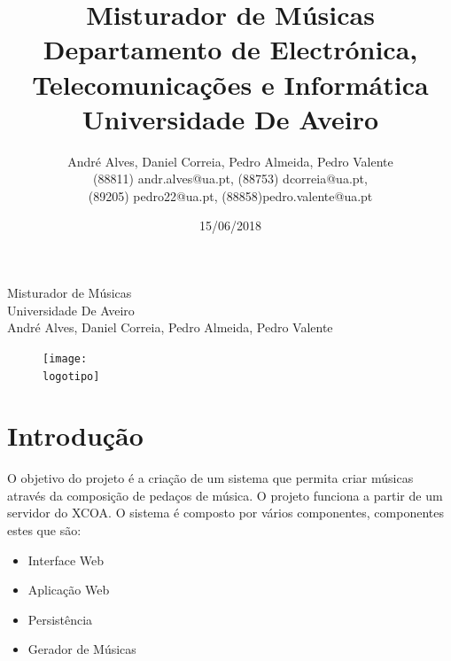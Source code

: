 \documentclass{report}
\begin{document}
%
\def\titulo{Misturador de Músicas}
\def\data{15/06/2018}
\def\autores{André Alves, Daniel Correia, Pedro Almeida, Pedro Valente}
\def\autorescontactos{(88811) andr.alves@ua.pt, (88753) dcorreia@ua.pt,\\
 (89205) pedro22@ua.pt, (88858)pedro.valente@ua.pt}
\def\departamento{Departamento de Electrónica, Telecomunicações e Informática}
\def\empresa{Universidade De Aveiro}
\def\logotipo{img/ua.pdf}
%

%
\begin{titlepage}

\begin{center}
%
\vspace*{50mm}
%
{\Huge \titulo}\\ 
%
\vspace{10mm}
%
{\Large \empresa}\\
%
\vspace{10mm}
%
{\LARGE \autores}\\ 
%
\vspace{30mm}
%
\begin{figure}[h]
\center
\texttt{[image: \\logotipo]}
\end{figure}
%
\vspace{30mm}
\end{center}
%

\end{titlepage}

\title{%
{\Huge\textbf{\titulo}}\\
{\Large \departamento\\ \empresa}
}
%
\author{%
    \autores \\
    \autorescontactos
}
%
\date{\data}
%
\maketitle


\chapter{Introdução}
\label{chap.introducao}
O objetivo do projeto é a criação de um sistema que permita criar músicas através da
composição de pedaços de música. O projeto funciona a partir de um servidor do XCOA.
O sistema é composto por vários componentes, componentes estes que são:
\begin{itemize}
	\item Interface Web
	\item Aplicação Web
	\item Persistência
	\item Gerador de Músicas
\end{itemize}	
\end{document}
